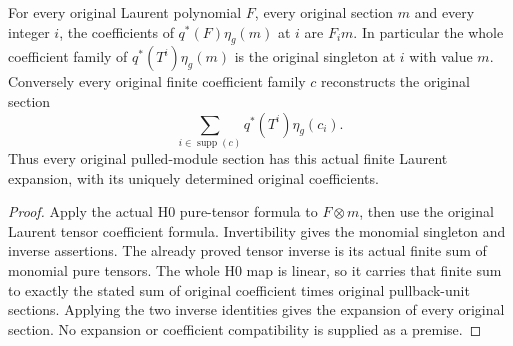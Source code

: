 \begin{theorem}\label{thm:fc-scheme-module-laurent-coefficient-formulas}
\leanok
{}
For every original Laurent polynomial $F$, every original section $m$
and every integer $i$, the coefficients of
$q^*(F)\eta_g(m)$ at $i$ are $F_i m$. In particular the whole coefficient
family of $q^*(T^i)\eta_g(m)$ is the original singleton at $i$ with
value $m$. Conversely every original finite coefficient family $c$
reconstructs the original section
\[
 \sum_{i\in\operatorname{supp}(c)}q^*(T^i)\eta_g(c_i).
\]
Thus every original pulled-module section has this actual finite
Laurent expansion, with its uniquely determined original coefficients.
\end{theorem}
\begin{proof}
Apply the actual H0 pure-tensor formula to $F\otimes m$, then use the
original Laurent tensor coefficient formula. Invertibility gives the
monomial singleton and inverse assertions. The already proved tensor
inverse is its actual finite sum of monomial pure tensors. The whole
H0 map is linear, so it carries that finite sum to exactly the stated
sum of original coefficient times original pullback-unit sections.
Applying the two inverse identities gives the expansion of every
original section. No expansion or coefficient compatibility is
supplied as a premise.
\end{proof}

